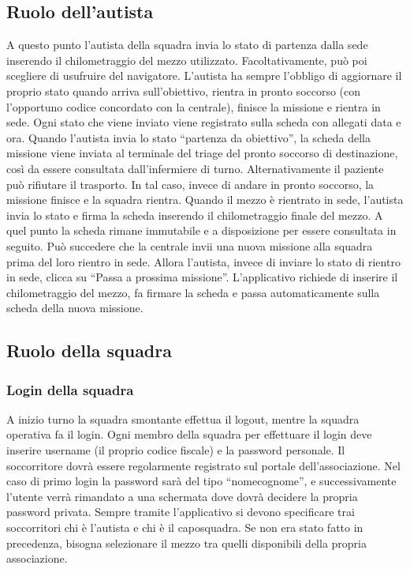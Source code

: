 \documentclass{article}
\begin{document}
    \subsection{Ruolo dell’autista}
    A questo punto l’autista della squadra invia lo stato di partenza dalla sede inserendo il chilometraggio del mezzo utilizzato. Facoltativamente, può poi scegliere di usufruire del navigatore.
    L’autista ha sempre l’obbligo di aggiornare il proprio stato quando arriva sull’obiettivo, rientra in pronto soccorso (con l’opportuno codice concordato con la centrale), finisce la missione e rientra in sede. Ogni stato che viene inviato viene registrato sulla scheda con allegati data e ora.
    Quando l’autista invia lo stato “partenza da obiettivo”, la scheda della missione viene inviata al terminale del triage del pronto soccorso di destinazione, così da essere consultata dall’infermiere di turno.
    Alternativamente il paziente può rifiutare il trasporto. In tal caso, invece di andare in pronto soccorso, la missione finisce e la squadra rientra.
    Quando il mezzo è rientrato in sede, l’autista invia lo stato e firma la scheda inserendo il chilometraggio finale del mezzo. A quel punto la scheda rimane immutabile e a disposizione per essere consultata in seguito.
    Può succedere che la centrale invii una nuova missione alla squadra prima del loro rientro in sede.
    Allora l’autista, invece di inviare lo stato di rientro in sede, clicca su “Passa a prossima missione”. L’applicativo richiede di inserire il chilometraggio del mezzo, fa firmare la scheda e passa automaticamente sulla scheda della nuova missione.

    \subsection{Ruolo della squadra}
    \subsubsection{Login della squadra}
    A inizio turno la squadra smontante effettua il logout, mentre la squadra operativa fa il login.
    Ogni membro della squadra per effettuare il login deve inserire username (il proprio codice fiscale) e la  password personale. Il soccorritore dovrà essere regolarmente registrato sul portale dell’associazione. Nel caso di primo login la password sarà del tipo “nomecognome”, e successivamente l’utente verrà rimandato a una schermata dove dovrà decidere la propria password privata.
    Sempre tramite l’applicativo si devono specificare trai soccorritori chi è l’autista e chi è il caposquadra.
    Se non era stato fatto in precedenza, bisogna selezionare il mezzo tra quelli disponibili della propria associazione.
\end{document}

